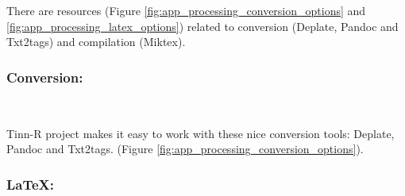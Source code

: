 There are resources
(Figure \ref{fig:app_processing_conversion_options} and
\ref{fig:app_processing_latex_options})
related to conversion (Deplate, Pandoc and Txt2tags) and compilation (Miktex).


\hypertarget{working_app_processing_conversion}{}
\subsubsection{Conversion:}\\

Tinn-R project makes it easy to work with these nice conversion tools: Deplate, Pandoc and Txt2tags.
(Figure \ref{fig:app_processing_conversion_options}).


\hypertarget{working_app_processing_latex}{}
\subsubsection{\LaTeX:}\\

